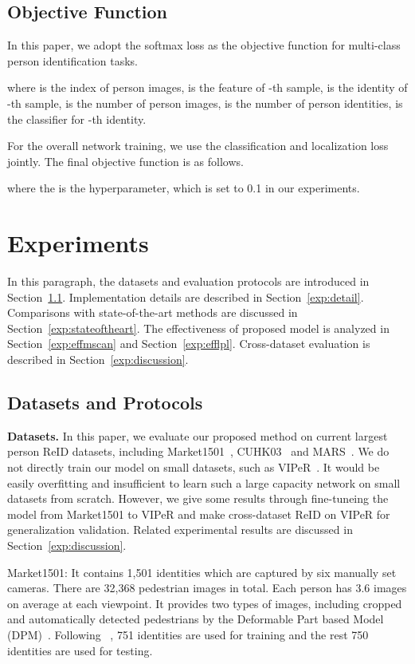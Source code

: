 \documentclass[10pt,twocolumn,letterpaper]{article}
\begin{document}
\subsection{Objective Function}
\label{ObjectiveFunction}

In this paper, we adopt the softmax loss as the objective function for multi-class person identification tasks.

where  is the index of person images,  is the feature of -th sample,  is the identity of -th sample,
 is the number of person images,  is the number of person identities,  is the classifier for -th identity.

For the overall network training, we use the classification and localization loss jointly.
The final objective function is as follows.

where the  is the hyperparameter, which is set to 0.1 in our experiments.

\section{Experiments}
\label{experiments}
In this paragraph, the datasets and evaluation protocols are introduced in Section~\ref{exp:dataset}.
Implementation details are described in Section~\ref{exp:detail}.
Comparisons with state-of-the-art methods are discussed in Section~\ref{exp:stateoftheart}.
The effectiveness of proposed model is analyzed in Section~\ref{exp:effmscan} and Section~\ref{exp:efflpl}.
Cross-dataset evaluation is described in Section~\ref{exp:discussion}.

\subsection{Datasets and Protocols}
\label{exp:dataset}
\textbf{Datasets.} In this paper, we evaluate our proposed method on current largest person ReID datasets,
including Market1501~\cite{ZhengliangICCV15}, CUHK03~\cite{LiWeiCVPR14} and MARS~\cite{ZhengliangECCV16}.
We do not directly train our model on small datasets, such as VIPeR~\cite{Gray07VIPeR}.
It would be easily overfitting and insufficient to learn such a large capacity network on small datasets from scratch.
However, we give some results through fine-tuneing the model from Market1501 to VIPeR and make cross-dataset ReID on VIPeR for generalization validation.
Related experimental results are discussed in Section~\ref{exp:discussion}.



Market1501: It contains 1,501 identities which are captured by six manually set cameras.
There are 32,368 pedestrian images in total.
Each person has 3.6 images on average at each viewpoint.
It provides two types of images, including cropped and automatically detected pedestrians by the Deformable Part based Model (DPM)~\cite{FelzenszwalbPAMI10object}.
Following ~\cite{ZhengliangICCV15}, 751 identities are used for training and the rest 750 identities are used for testing.
\end{document}

